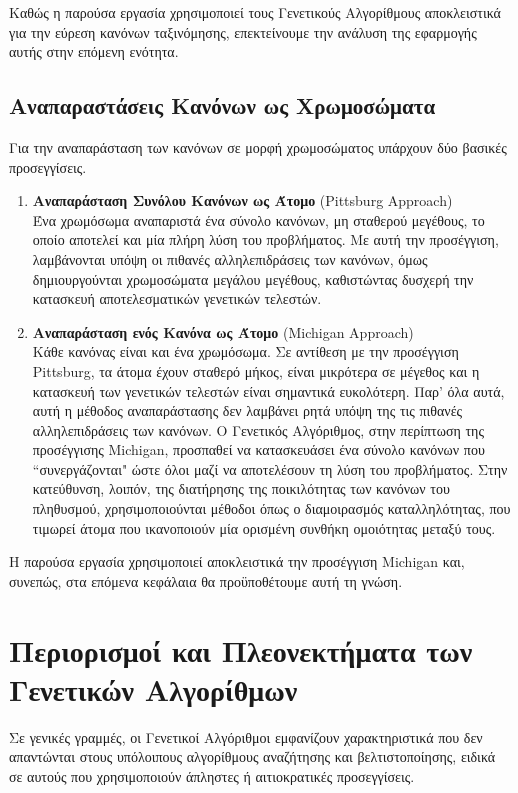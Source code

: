 Καθώς η παρούσα εργασία χρησιμοποιεί τους Γενετικούς Αλγορίθμους αποκλειστικά για την εύρεση κανόνων ταξινόμησης, επεκτείνουμε την ανάλυση της εφαρμογής αυτής στην επόμενη ενότητα.

\subsection{Αναπαραστάσεις Κανόνων ως Χρωμοσώματα} 
\label{subsec:michiganPittsburg}
Για την αναπαράσταση των κανόνων σε μορφή χρωμοσώματος υπάρχουν δύο βασικές προσεγγίσεις.

\begin{enumerate}
\item\textbf{Αναπαράσταση Συνόλου Κανόνων ως Άτομο} (Pittsburg Approach)
\\
Ένα χρωμόσωμα αναπαριστά ένα σύνολο κανόνων, μη σταθερού μεγέθους, το οποίο αποτελεί και μία πλήρη λύση του προβλήματος. Με αυτή την προσέγγιση, λαμβάνονται υπόψη οι πιθανές αλληλεπιδράσεις των κανόνων, όμως δημιουργούνται χρωμοσώματα μεγάλου μεγέθους, καθιστώντας δυσχερή την κατασκευή αποτελεσματικών γενετικών τελεστών.
\item\textbf{Αναπαράσταση ενός Κανόνα ως Άτομο} (Michigan Approach)
\\
Κάθε κανόνας είναι και ένα χρωμόσωμα. Σε αντίθεση με την προσέγγιση Pittsburg, τα άτομα έχουν σταθερό μήκος, είναι μικρότερα σε μέγεθος και η κατασκευή των γενετικών τελεστών είναι σημαντικά ευκολότερη. Παρ' όλα αυτά, αυτή η μέθοδος αναπαράστασης δεν λαμβάνει ρητά υπόψη της τις πιθανές αλληλεπιδράσεις των κανόνων. Ο Γενετικός Αλγόριθμος, στην περίπτωση της προσέγγισης Michigan, προσπαθεί να κατασκευάσει ένα σύνολο κανόνων που “συνεργάζονται" ώστε όλοι μαζί να αποτελέσουν τη λύση του προβλήματος. Στην κατεύθυνση, λοιπόν, της διατήρησης της ποικιλότητας των κανόνων του πληθυσμού, χρησιμοποιούνται μέθοδοι όπως ο διαμοιρασμός καταλληλότητας, που τιμωρεί άτομα που ικανοποιούν μία ορισμένη συνθήκη ομοιότητας μεταξύ τους.
\end{enumerate}

Η παρούσα εργασία χρησιμοποιεί αποκλειστικά την προσέγγιση Michigan και, συνεπώς, στα επόμενα κεφάλαια θα προϋποθέτουμε αυτή τη γνώση.

\section{Περιορισμοί και Πλεονεκτήματα των Γενετικών Αλγορίθμων}
Σε γενικές γραμμές, οι Γενετικοί Αλγόριθμοι εμφανίζουν χαρακτηριστικά που δεν απαντώνται στους υπόλοιπους αλγορίθμους αναζήτησης και βελτιστοποίησης, ειδικά σε αυτούς που χρησιμοποιούν άπληστες ή αιτιοκρατικές προσεγγίσεις.

